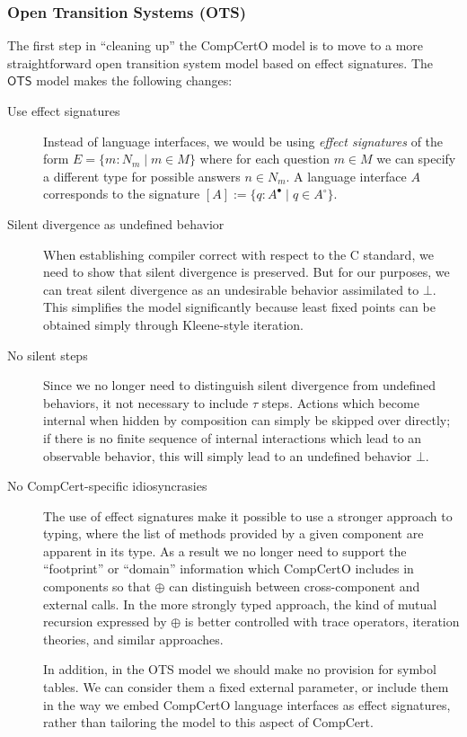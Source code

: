 \documentclass{article}
\begin{document}
\subsubsection{Open Transition Systems (OTS)} %

The first step in ``cleaning up'' the CompCertO model
is to move to a more straightforward open transition system model
based on effect signatures.
The $\mathsf{OTS}$ model makes the following changes:
\begin{description}
\item[Use effect signatures]
  Instead of language interfaces,
  we would be using
  \emph{effect signatures} of the form $E = \{ m : N_m \mid m \in M \}$
  where for each question $m \in M$
  we can specify a different type for possible answers $n \in N_m$.
  A language interface $A$ corresponds to the signature
  $[A] := \{ q : A^\bullet \mid q \in A^\circ \}$.

\item[Silent divergence as undefined behavior]
  When establishing compiler correct with respect to the C standard,
  we need to show that silent divergence is preserved.
  But for our purposes,
  we can treat silent divergence as an undesirable behavior
  assimilated to $\bot$.
  This simplifies the model significantly
  because least fixed points can be obtained simply through
  Kleene-style iteration.

\item[No silent steps]
  Since we no longer need
  to distinguish silent divergence from undefined behaviors,
  it not necessary to include $\tau$ steps.
  Actions which become internal when hidden by composition
  can simply be skipped over directly;
  if there is no finite sequence of internal interactions
  which lead to an observable behavior,
  this will simply lead to an undefined behavior $\bot$.

\item[No CompCert-specific idiosyncrasies]
  The use of effect signatures make it possible to use
  a stronger approach to typing,
  where the list of methods provided by a given component
  are apparent in its type.
  As a result we no longer need to support
  the ``footprint'' or ``domain'' information
  which CompCertO includes in components so that $\oplus$
  can distinguish between cross-component and external calls.
  In the more strongly typed approach,
  the kind of mutual recursion expressed by $\oplus$
  is better controlled with trace operators, iteration theories,
  and similar approaches.

  In addition,
  in the OTS model we should make no provision for symbol tables.
  We can consider them a fixed external parameter,
  or include them in the way we embed CompCertO language interfaces
  as effect signatures,
  rather than tailoring the model to this aspect of CompCert.
\end{description}
\end{document}
